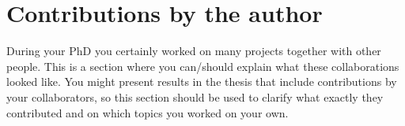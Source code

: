 \chapter*{Contributions by the author}
\label{sec:contributions}

During your PhD you certainly worked on many projects together with other people.
This is a section where you can/should explain what these collaborations looked like.
You might present results in the thesis that include contributions by your collaborators, so this section should be used to clarify what exactly they contributed and on which topics you worked on your own.
